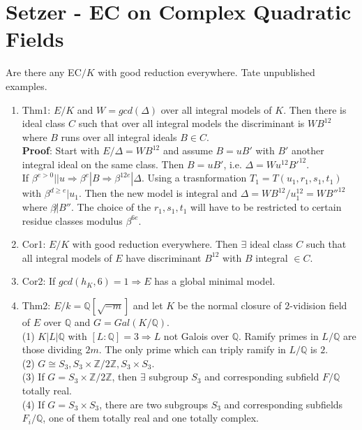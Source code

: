 \documentclass{article}
\newcommand{\Q}{\mathbb{Q}}
\newcommand{\Z}{\mathbb{Z}}
\newcommand{\Ra}{\Rightarrow}
\begin{document}
\section{Setzer - EC on Complex Quadratic Fields}
Are there any EC$/K$ with good reduction everywhere. Tate unpublished examples.
\begin{multicols}{2}
\begin{enumerate}

\item Thm1: $E/K$ and $W = gcd(\Delta)$ over all integral models of $K$. Then there is ideal class $C$ such that over all integral models the discriminant is $WB^{12}$ where $B$ runs over all integral ideals $B \in C$. \\

\textbf{Proof}: 
Start with $E/ \Delta = WB^{12}$ and assume $B = uB'$ with $B'$ another integral ideal on the same class. Then $B = uB'$, i.e. $\Delta = Wu^{12}B'^{12}$.\\

If $\beta^{e > 0}||u \Ra \beta^{e}|B \Ra \beta^{12e}|\Delta$. Using a trasnformation $T_1 = T(u_1,r_1,s_1,t_1)$ with $\beta^{d \geq e} |u_1$. Then the new model is integral and $\Delta = WB^{12}/u_1^{12} = WB''^{12}$ where $\beta\not| B''$. The choice of the $r_1,s_1,t_1$ will have to be restricted to certain residue classes modulus $\beta^{6e}$. 

\item Cor1: $E/K$ with good reduction everywhere. Then $\exists$ ideal class $C$ such that all integral models of $E$ have discriminant $B^{12}$ with $B$ integral $\in C$. 

\item Cor2: If $gcd(h_K,6) = 1 \Ra E$ has a global minimal model. 

\item Thm2: $E/k = \Q[\sqrt{-m}]$ and let $K$ be the normal closure of $2$-vidision field of $E$ over $\Q$ and $G = Gal(K/\Q)$. \\
(1) $K|L|\Q$ with $[L:\Q] = 3 \Ra L$ not Galois over $\Q$. Ramify primes in $L/\Q$ are those dividing $2m$. The only prime which can triply ramify in $L/\Q$ is $2$.\\
(2) $G \cong S_3, S_3 \times \Z/2\Z, S_3 \times S_3$. \\
(3) If $G = S_3 \times \Z/2\Z$, then $\exists$ subgroup $S_3$ and corresponding subfield $F/\Q$ totally real. \\
(4) If $G = S_3 \times S_3$, there are two subgroups $S_3$ and corresponding subfields $F_i/\Q$, one of them totally real and one totally complex. 


\end{enumerate}
\end{multicols}
\end{document}
